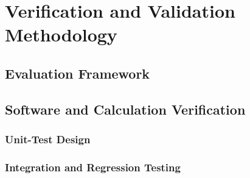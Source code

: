 \chapter{Verification and Validation Methodology}
\label{chap:validation-method}

%

\section{Evaluation Framework}
\label{sec:evaluation-framework}


\section{Software and Calculation Verification}
\label{sec:calculation-verification}

\subsection{Unit-Test Design}

\subsection{Integration and Regression Testing}

